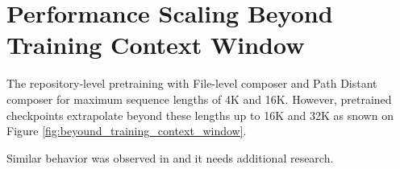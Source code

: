 \section{Performance Scaling Beyond Training Context Window}
\label{appendix:context-scaling}

The repository-level pretraining with File-level composer and Path Distant composer for maximum sequence lengths of 4K and 16K. However, pretrained checkpoints extrapolate beyond these lengths up to 16K and 32K as snown on Figure \ref{fig:beyound_training_context_window}.

Similar behavior was observed in \citet{codellama} and it needs additional research.


